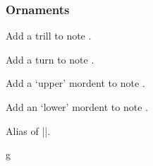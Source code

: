 \subsubsection{Ornaments}\label{sec:music-notes:misc:ornaments}
\begin{command}{\tmtrill{}}
  Add a trill to note .
\end{command}
\begin{command}{\tmturn{}}
  Add a turn to note .
\end{command}
\begin{command}{\tmuppermordent{}}
  Add a `upper' mordent to note .
\end{command}
\begin{command}{\tmlowermordent{}}
  Add an `lower' mordent to note .
\end{command}
\begin{command}{\tmmordent{}}
  Alias of |\tmuppermordent|.
\end{command}
\begin{codeexample}[]
\begin{tmline}
\begin{tmstaff}{g}{}
\end{tmstaff}
\end{tmline}
\end{codeexample}
